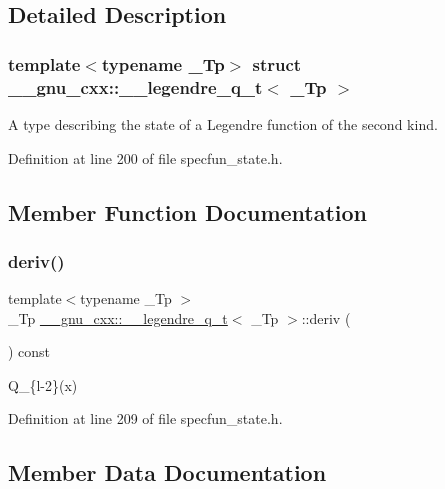 \subsection{Detailed Description}
\subsubsection*{template$<$typename \+\_\+\+Tp$>$\newline
struct \+\_\+\+\_\+gnu\+\_\+cxx\+::\+\_\+\+\_\+legendre\+\_\+q\+\_\+t$<$ \+\_\+\+Tp $>$}

A type describing the state of a Legendre function of the second kind. 

Definition at line 200 of file specfun\+\_\+state.\+h.



\subsection{Member Function Documentation}
\mbox{\label{struct____gnu__cxx_1_1____legendre__q__t_a47e11f04ee7a2c0cec32a2ce4dacb297}} 
\subsubsection{\texorpdfstring{deriv()}{deriv()}}
{\footnotesize\ttfamily template$<$typename \+\_\+\+Tp $>$ \\
\+\_\+\+Tp \hyperlink{struct____gnu__cxx_1_1____legendre__q__t}{\+\_\+\+\_\+gnu\+\_\+cxx\+::\+\_\+\+\_\+legendre\+\_\+q\+\_\+t}$<$ \+\_\+\+Tp $>$\+::deriv (\begin{DoxyParamCaption}{ }\end{DoxyParamCaption}) const\hspace{0.3cm}{\ttfamily [inline]}}



Q\+\_\+\{l-\/2\}(x) 



Definition at line 209 of file specfun\+\_\+state.\+h.



\subsection{Member Data Documentation}
\mbox{\label{struct____gnu__cxx_1_1____legendre__q__t_aaa8ceebd04ced598efdac0063b0b0b42}} 
